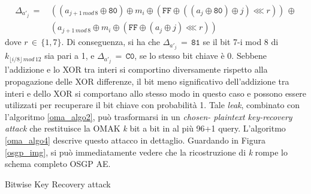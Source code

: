\begin{equation*}
\begin{split}
\Delta_{a'_j} \, = \, & ((a_{j+1 \, mod \, 8} \oplus \texttt{80}) \oplus m_i \oplus (\texttt{FF} \oplus ((a_j \oplus \texttt{80}) \oplus j) \lll r)) \, \oplus \\
&(a_{j+1 \, mod \, 8} \oplus m_i \oplus (\texttt{FF} \oplus (a_j \oplus j) \lll r))
\end{split}
\end{equation*}
dove $r\,\in \, \{1,7\}$. Di conseguenza, si ha che $\Delta_{a'_j}\,=\,\texttt{81}$ se il bit 7-i mod 8 di $k_{\lfloor i/8 \rfloor \, mod \, 12}$ sia pari a 1, e $\Delta_{a'_j}\,=\,\texttt{C0}$, se lo stesso bit chiave è 0. Sebbene l'addizione e lo XOR tra interi si comportino diversamente rispetto alla propagazione delle XOR differenze, il bit meno significativo dell'addizione tra interi e dello XOR si comportano allo stesso modo in questo caso e possono essere utilizzati per recuperare il bit chiave con probabilità 1. \newline
Tale \textit{leak}, combinato con l'algoritmo \ref{oma_algo2}, può trasformarsi in un \textit{chosen- plaintext key-recovery attack} che restituisce la OMAK \textit{k} bit a bit in al più 96+1 query. L'algoritmo \ref{oma_algo4} descrive questo attacco in dettaglio. Guardando in Figura \ref{osgp_img}, si può immediatamente vedere che la ricostruzione di \textit{k} rompe lo schema completo OSGP AE.
\begin{algorithm}
\caption{Bitwise Key Recovery attack}
\label{oma_algo4}
\end{algorithm}
